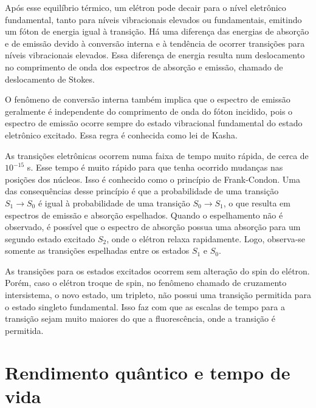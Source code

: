 		Após esse equilíbrio térmico, um elétron pode decair para o nível eletrônico fundamental, tanto para níveis vibracionais elevados ou fundamentais, emitindo um fóton de energia igual à transição. Há uma diferença das energias de absorção e de emissão devido à conversão interna e à tendência de ocorrer transições para níveis vibracionais elevados. Essa diferença de energia resulta num deslocamento no comprimento de onda dos espectros de absorção e emissão, chamado de deslocamento de Stokes.\cite{Lakowicz2006} 
		
		O fenômeno de conversão interna também implica que o espectro de emissão geralmente é independente do comprimento de onda do fóton incidido, pois o espectro de emissão ocorre sempre do estado vibracional fundamental do estado eletrônico excitado. Essa regra é conhecida como lei de Kasha.\cite{Lakowicz2006} 
		
		As transições eletrônicas ocorrem numa faixa de tempo muito rápida, de cerca de \(10^{-15}\) s. Esse tempo é muito rápido para que tenha ocorrido mudanças nas posições dos núcleos. Isso é conhecido como o princípio de Frank-Condon.  Uma das consequências desse princípio é que a probabilidade de uma transição \(S_1 \to S_0\) é igual à probabilidade de uma transição \(S_0 \to S_1\), o que resulta em espectros de emissão e absorção espelhados. Quando o espelhamento não é observado, é possível que o espectro de absorção possua uma absorção para um segundo estado excitado \(S_2\), onde o elétron relaxa rapidamente. Logo, observa-se somente as transições espelhadas entre os estados \(S_1\) e \(S_0\).
			
		As transições para os estados excitados ocorrem sem alteração do spin do elétron. Porém, caso o elétron troque de spin, no fenômeno chamado de cruzamento intersistema,  o novo estado, um tripleto, não possui uma transição permitida para o estado singleto fundamental. Isso faz com que as escalas de tempo para a transição sejam muito maiores do que a fluorescência, onde a transição é permitida.
		
		\vfill
		
		\section{Rendimento quântico e tempo de vida} 
				
